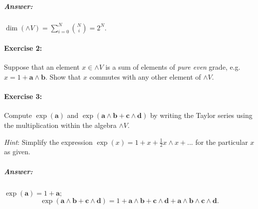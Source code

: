\subparagraph{Answer: }

$\dim\left(\wedge V\right)=\sum_{i=0}^{N}{N \choose i}=2^{N}$.


\paragraph{Exercise 2:}

Suppose that an element $x\in\wedge V$ is a sum of elements of \emph{pure
even} grade, e.g.~$x=1+\mathbf{a}\wedge\mathbf{b}$. Show that $x$
commutes with any other element of $\wedge V$. 


\paragraph{Exercise 3:}

Compute $\exp\left(\mathbf{a}\right)$ and $\exp\left(\mathbf{a}\wedge\mathbf{b}+\mathbf{c}\wedge\mathbf{d}\right)$
by writing the Taylor series using the multiplication within the algebra
$\wedge V$.

\emph{Hint}: Simplify the expression $\exp(x)=1+x+\frac{1}{2}x\wedge x+...$
for the particular $x$ as given.


\subparagraph{Answer: }

$\exp\left(\mathbf{a}\right)=1+\mathbf{a}$; \[
\exp\left(\mathbf{a}\wedge\mathbf{b}+\mathbf{c}\wedge\mathbf{d}\right)=1+\mathbf{a}\wedge\mathbf{b}+\mathbf{c}\wedge\mathbf{d}+\mathbf{a}\wedge\mathbf{b}\wedge\mathbf{c}\wedge\mathbf{d}.\]

